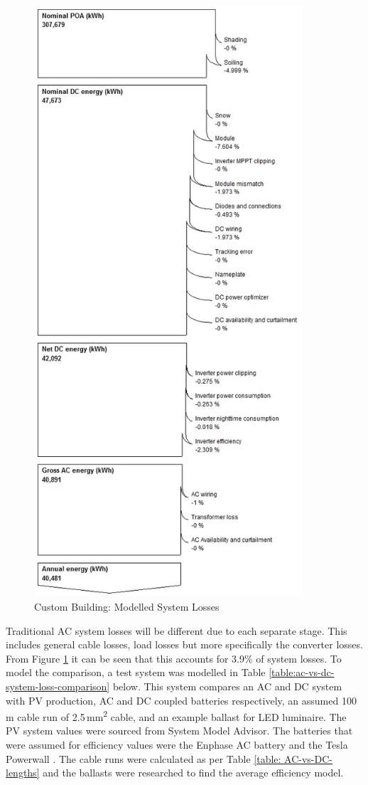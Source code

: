 \begin{figure}[H]
	\hfill\includegraphics[width = 100mm, height = 220mm]{images/custom-building/sam-losses-265w}\hspace*{\fill}
	\caption{Custom Building: Modelled System Losses} 
	\label{fig:custom-building-modelled-system-losses}
\end{figure}   

Traditional AC system losses will be different due to each separate stage. This includes general cable losses, load losses but more specifically the converter losses. From Figure \ref{fig:custom-building-modelled-system-losses} it can be seen that this accounts for 3.9\% of system losses. To model the comparison, a test system was modelled in Table \ref{table:ac-vs-dc-system-loss-comparison} below. This system compares an AC and DC system with PV production, AC and DC coupled batteries respectively, an assumed 100\,m cable run of 2.5\,\si{mm^2} cable, and an example ballast for LED luminaire. The PV system values were sourced from System Model Advisor. The batteries that were assumed for efficiency values were the Enphase AC battery \cite{website:Enphase-Battery-Data} and the Tesla Powerwall \cite{website:Tesla-Powerwall-Data}. The cable runs were calculated as per Table \ref{table: AC-vs-DC-lengths} and the ballasts were researched to find the average efficiency model.    

